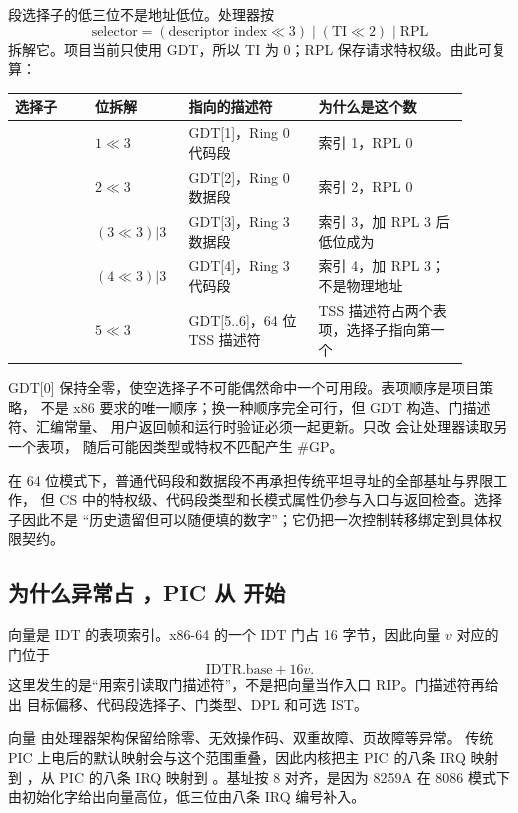 段选择子的低三位不是地址低位。处理器按
\[
  \text{selector}=(\text{descriptor index}\ll3)
  \mathbin{|}(\text{TI}\ll2)\mathbin{|}\text{RPL}
\]
拆解它。项目当前只使用 GDT，所以 TI 为 0；RPL 保存请求特权级。由此可复算：

\begin{longtable}{|L{0.16\linewidth}|L{0.18\linewidth}|L{0.26\linewidth}|L{0.30\linewidth}|}
\hline
选择子 & 位拆解 & 指向的描述符 & 为什么是这个数 \\ \hline
{} &
\(1\ll3\) &
GDT[1]，Ring 0 代码段 &
索引 1，RPL 0 \\\tablerowrule
{} &
\(2\ll3\) &
GDT[2]，Ring 0 数据段 &
索引 2，RPL 0 \\\tablerowrule
{} &
\((3\ll3)|3\) &
GDT[3]，Ring 3 数据段 &
索引 3，加 RPL 3 后低位成为  \\\tablerowrule
{} &
\((4\ll3)|3\) &
GDT[4]，Ring 3 代码段 &
索引 4，加 RPL 3；不是物理地址 \\\tablerowrule
{} &
\(5\ll3\) &
GDT[5..6]，64 位 TSS 描述符 &
TSS 描述符占两个表项，选择子指向第一个 \\ \hline
\end{longtable}

GDT[0] 保持全零，使空选择子不可能偶然命中一个可用段。表项顺序是项目策略，
不是 x86 要求的唯一顺序；换一种顺序完全可行，但 GDT 构造、门描述符、汇编常量、
用户返回帧和运行时验证必须一起更新。只改  会让处理器读取另一个表项，
随后可能因类型或特权不匹配产生 \#GP。

在 64 位模式下，普通代码段和数据段不再承担传统平坦寻址的全部基址与界限工作，
但 CS 中的特权级、代码段类型和长模式属性仍参与入口与返回检查。选择子因此不是
“历史遗留但可以随便填的数字”；它仍把一次控制转移绑定到具体权限契约。

\subsection{为什么异常占 ，PIC 从  开始}

向量是 IDT 的表项索引。x86-64 的一个 IDT 门占 16 字节，因此向量 \(v\) 对应的
门位于
\[
  \text{IDTR.base}+16v.
\]
这里发生的是“用索引读取门描述符”，不是把向量当作入口 RIP。门描述符再给出
目标偏移、代码段选择子、门类型、DPL 和可选 IST。

向量  由处理器架构保留给除零、无效操作码、双重故障、页故障等异常。
传统 PIC 上电后的默认映射会与这个范围重叠，因此内核把主 PIC 的八条 IRQ 映射到
，从 PIC 的八条 IRQ 映射到 。基址按 8 对齐，是因为
8259A 在 8086 模式下由初始化字给出向量高位，低三位由八条 IRQ 编号补入。

